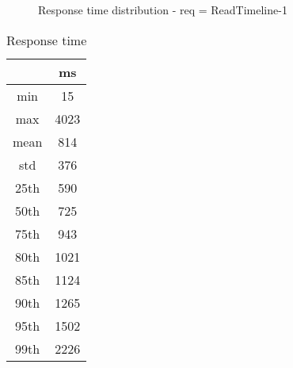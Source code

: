 \begin{minipage}{0.75\linewidth}
\begin{figure}[h]
\begin{adjustbox}{max width=1.0\linewidth, keepaspectratio}
  \end{adjustbox}
  \caption{Response time distribution - req = ReadTimeline-1}
\end{figure}
\end{minipage}\hfill\begin{minipage}{0.18\linewidth}
\begin{table}[h]
\begin{tabular}{|cc|}
\hline
\textbf{} & \textbf{ms}\\ \hline
 \Xhline{0.005\arrayrulewidth}
min & 15\\
 \Xhline{0.005\arrayrulewidth}
max & 4023\\
 \Xhline{0.005\arrayrulewidth}
mean & 814\\
 \Xhline{0.005\arrayrulewidth}
std & 376\\
\hline
\hline
 \Xhline{0.005\arrayrulewidth}
25th & 590\\
 \Xhline{0.005\arrayrulewidth}
50th & 725\\
 \Xhline{0.005\arrayrulewidth}
75th & 943\\
 \Xhline{0.005\arrayrulewidth}
80th & 1021\\
 \Xhline{0.005\arrayrulewidth}
85th & 1124\\
 \Xhline{0.005\arrayrulewidth}
90th & 1265\\
 \Xhline{0.005\arrayrulewidth}
95th & 1502\\
 \Xhline{0.005\arrayrulewidth}
99th & 2226\\
\hline
\end{tabular}
\caption{Response time}
\end{table}
\end{minipage}\hfill